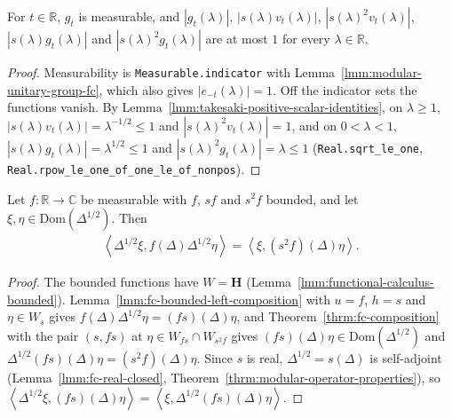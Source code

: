\begin{lemma}
    \label{lmm:takesaki-functions-aux-bounds}
    \leanok
    For $t \in \mathbb{R}$, $g_t$ is measurable, and $|g_t(\lambda)|$, $|s(\lambda)v_t(\lambda)|$, $|s(\lambda)^2v_t(\lambda)|$, $|s(\lambda)g_t(\lambda)|$ and $|s(\lambda)^2g_t(\lambda)|$ are at most $1$ for every $\lambda \in \mathbb{R}$.
\end{lemma}
\begin{proof}
    \leanok
    Measurability is \texttt{Measurable.indicator} with Lemma~\ref{lmm:modular-unitary-group-fc}, which also gives $|e_{-t}(\lambda)| = 1$. Off the indicator sets the functions vanish. By Lemma~\ref{lmm:takesaki-positive-scalar-identities}, on $\lambda \ge 1$, $|s(\lambda)v_t(\lambda)| = \lambda^{-1/2} \le 1$ and $|s(\lambda)^2v_t(\lambda)| = 1$, and on $0 < \lambda < 1$, $|s(\lambda)g_t(\lambda)| = \lambda^{1/2} \le 1$ and $|s(\lambda)^2g_t(\lambda)| = \lambda \le 1$ (\texttt{Real.sqrt\_le\_one}, \texttt{Real.rpow\_le\_one\_of\_one\_le\_of\_nonpos}).
\end{proof}

\begin{lemma}
    \label{lmm:modular-sqrt-transfer}
    \leanok
    Let $f : \mathbb{R} \to \mathbb{C}$ be measurable with $f$, $sf$ and $s^2f$ bounded, and let $\xi, \eta \in \text{Dom}(\Delta^{1/2})$. Then
    \begin{align}
        \left< \Delta^{1/2}\xi, f(\Delta)\Delta^{1/2}\eta \right> = \left< \xi, (s^2f)(\Delta)\eta \right>.
    \end{align}
\end{lemma}
\begin{proof}
    \leanok
    The bounded functions have $W = \mathbf{H}$ (Lemma~\ref{lmm:functional-calculus-bounded}). Lemma~\ref{lmm:fc-bounded-left-composition} with $u = f$, $h = s$ and $\eta \in W_s$ gives $f(\Delta)\Delta^{1/2}\eta = (fs)(\Delta)\eta$, and Theorem~\ref{thrm:fc-composition} with the pair $(s, fs)$ at $\eta \in W_{fs} \cap W_{s^2f}$ gives $(fs)(\Delta)\eta \in \text{Dom}(\Delta^{1/2})$ and $\Delta^{1/2}(fs)(\Delta)\eta = (s^2f)(\Delta)\eta$. Since $s$ is real, $\Delta^{1/2} = s(\Delta)$ is self-adjoint (Lemma~\ref{lmm:fc-real-closed}, Theorem~\ref{thrm:modular-operator-properties}), so $\left< \Delta^{1/2}\xi, (fs)(\Delta)\eta \right> = \left< \xi, \Delta^{1/2}(fs)(\Delta)\eta \right>$.
\end{proof}

